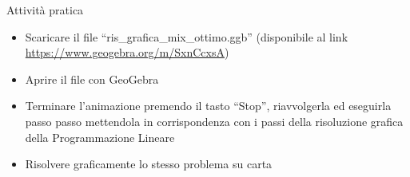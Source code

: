 \documentclass{beamer}
\begin{document}
\generatitolo

\begin{frame}{Attivit\`a pratica}

    \begin{itemize}
    
     \item Scaricare il file ``ris\_grafica\_mix\_ottimo.ggb''
     (disponibile al link
     \url{https://www.geogebra.org/m/SxnCcxsA})
     
     \item Aprire il file con \alert{GeoGebra}
     
     \item Terminare l'animazione premendo il tasto ``Stop'',
     riavvolgerla ed eseguirla passo passo mettendola in
     corrispondenza con i passi della risoluzione grafica della
     Programmazione Lineare
     
     \item Risolvere graficamente lo stesso problema su carta
    
    \end{itemize}
\end{frame}
\end{document}
